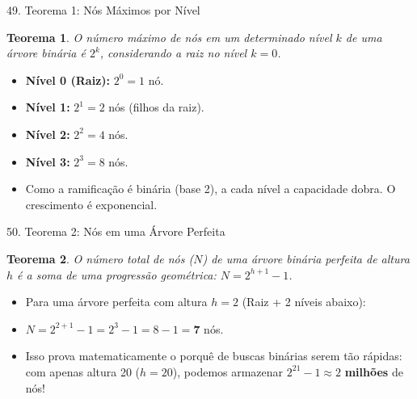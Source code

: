 \documentclass[9pt]{beamer}
\newtheorem{teorema}{Teorema}\usepackage{mathtools}
\begin{document}
    \begin{frame}{49. Teorema 1: Nós Máximos por Nível}
        \begin{teorema}
            O número máximo de nós em um determinado nível $k$ de uma árvore binária é \textbf{$2^k$}, considerando a raiz no nível $k=0$.
        \end{teorema}
        \vspace{0.3cm}
        \begin{itemize}
            \item \textbf{Nível 0 (Raiz):} $2^0 = 1$ nó.
            \item \textbf{Nível 1:} $2^1 = 2$ nós (filhos da raiz).
            \item \textbf{Nível 2:} $2^2 = 4$ nós.
            \item \textbf{Nível 3:} $2^3 = 8$ nós.
            \item Como a ramificação é binária (base 2), a cada nível a capacidade dobra. O crescimento é exponencial.
        \end{itemize}
    \end{frame}

    \begin{frame}{50. Teorema 2: Nós em uma Árvore Perfeita}
        \begin{teorema}
            O número total de nós ($N$) de uma árvore binária perfeita de altura $h$ é a soma de uma progressão geométrica: \textbf{$N = 2^{h+1} - 1$}.
        \end{teorema}
        \vspace{0.3cm}
        \begin{itemize}
            \item Para uma árvore perfeita com altura $h=2$ (Raiz + 2 níveis abaixo):
            \item $N = 2^{2+1} - 1 = 2^3 - 1 = 8 - 1 = \textbf{7}$ nós.
            \item Isso prova matematicamente o porquê de buscas binárias serem tão rápidas: com apenas altura 20 ($h=20$), podemos armazenar $2^{21} - 1 \approx 2$ \textbf{milhões} de nós!
        \end{itemize}
    \end{frame}
\end{document}
